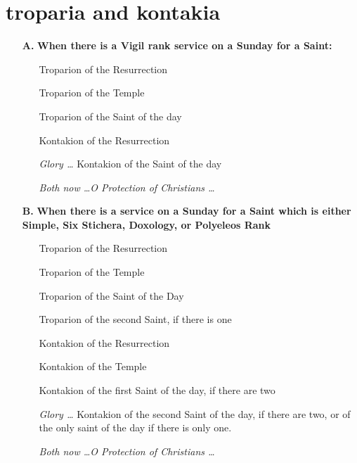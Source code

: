 \section{troparia and kontakia}


\begin{enumerate}
    \item[\textbf{A.}] \textbf{When there is a Vigil rank service on a Sunday for a Saint:} 
    \begin{enumerate}
        \item[] Troparion of the Resurrection
        \item[] Troparion of the Temple
        \item[] Troparion of the Saint of the day
        \item[] Kontakion of the Resurrection
        \item[] \textit{Glory \dots} Kontakion of the Saint of the day
        \item[] \textit{Both now \dots O Protection of Christians \dots}
    \end{enumerate}
    \item[\textbf{B.}] \textbf{When there is a service on a Sunday for a Saint which is either Simple, Six Stichera, Doxology, or Polyeleos Rank}
    \begin{enumerate}
        \item[] Troparion of the Resurrection
        \item[] Troparion of the Temple
        \item[] Troparion of the Saint of the Day
        \item[] Troparion of the second Saint, if there is one
        \item[] Kontakion of the Resurrection
        \item[] Kontakion of the Temple
        \item[] Kontakion of the first Saint of the day, if there are two
        \item[] \textit{Glory \dots} Kontakion of the second Saint of the day, if there are two, or of the only saint of the day if there is only one.
        \item[] \textit{Both now \dots O Protection of Christians \dots}
    \end{enumerate}
\end{enumerate}